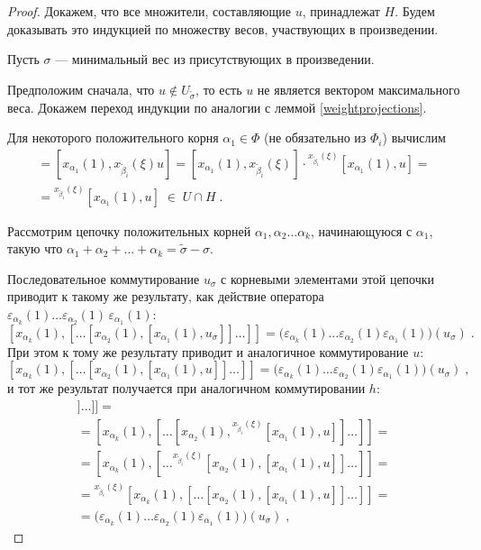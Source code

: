 \documentclass[12pt]{matmex-diploma}
\theoremstyle{mystyleni}
\theoremstyle{mystyle}
\newcommand\refb[1]{\ref{#1}}
\begin{document}
\begin{proof}
Докажем, что все множители, составляющие $u$, принадлежат $H$. Будем доказывать это индукцией по множеству весов, участвующих в произведении.

Пусть $\sigma$ --- минимальный вес из присутствующих в произведении.

Предположим сначала, что $u \notin U_{\widetilde\sigma}$, то есть $u$ не является вектором максимального веса. Докажем переход индукции по аналогии с леммой \refb{weightprojections}.

Для некоторого положительного корня $\alpha_1 \in \Phi$ (не обязательно из $\Phi_i$) вычислим
\begin{multline*}
[x_{\alpha_1}(1), h] = [x_{\alpha_1}(1), x_{\widetilde\beta_i}(\xi)u] =
[x_{\alpha_1}(1), x_{\widetilde\beta_i}(\xi)] \cdot {}^{x_{\widetilde\beta_i}(\xi)}[x_{\alpha_1}(1),u] =\\=
{}^{x_{\widetilde\beta_i}(\xi)}[x_{\alpha_1}(1),u] \; \in \; U \cap H \; .
\end{multline*}

Рассмотрим цепочку положительных корней $\alpha_1,\alpha_2 \ldots \alpha_k$, начинающуюся с $\alpha_1$, такую что $\alpha_1+\alpha_2+\ldots+\alpha_k=\widetilde\sigma-\sigma$. 

Последовательное коммутирование $u_\sigma$ с корневыми элементами этой цепочки приводит к такому же результату, как действие оператора $\varepsilon_{\alpha_k}(1)\ldots\varepsilon_{\alpha_2}(1)\,\varepsilon_{\alpha_1}(1)$:
$$ [x_{\alpha_k}(1),[\ldots[x_{\alpha_2}(1),[x_{\alpha_1}(1),u_\sigma]]\ldots]] =
\big(\varepsilon_{\alpha_k}(1)\ldots\varepsilon_{\alpha_2}(1)\varepsilon_{\alpha_1}(1)\big)(u_\sigma) \;.$$
При этом к тому же результату приводит и аналогичное коммутирование $u$:
$$ [x_{\alpha_k}(1),[\ldots[x_{\alpha_2}(1),[x_{\alpha_1}(1),u]]\ldots]] =
\big(\varepsilon_{\alpha_k}(1)\ldots\varepsilon_{\alpha_2}(1)\varepsilon_{\alpha_1}(1)\big)(u_\sigma) \;,$$
и тот же результат получается при аналогичном коммутировании $h$:
\begin{multline*}
[x_{\alpha_k}(1),[\ldots[x_{\alpha_2}(1),[x_{\alpha_1}(1),h]]\ldots]] =\\=
[x_{\alpha_k}(1),[\ldots[x_{\alpha_2}(1),{}^{x_{\widetilde\beta_i}(\xi)}[x_{\alpha_1}(1),u]]\ldots]] =\\=
[x_{\alpha_k}(1),[\ldots{}^{x_{\widetilde\beta_i}(\xi)}[x_{\alpha_2}(1),[x_{\alpha_1}(1),u]]\ldots]] =\\=
{}^{x_{\widetilde\beta_i}(\xi)}[x_{\alpha_k}(1),[\ldots[x_{\alpha_2}(1),[x_{\alpha_1}(1),u]]\ldots]] =\\=
\big(\varepsilon_{\alpha_k}(1)\ldots\varepsilon_{\alpha_2}(1)\varepsilon_{\alpha_1}(1)\big)(u_\sigma) \;,
\end{multline*}


\end{proof}
\end{document}
